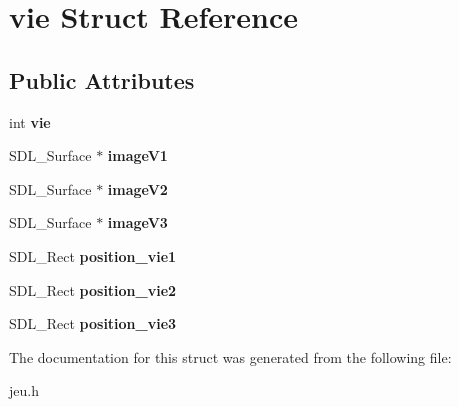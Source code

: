 \hypertarget{structvie}{}\section{vie Struct Reference}
\label{structvie}
\subsection*{Public Attributes}
\begin{DoxyCompactItemize}
\item 
\mbox{\label{structvie_a9148adc5f8f6ec8d8f727ac66a8962e9}} 
int {\bfseries vie}
\item 
\mbox{\label{structvie_a518752714976c2cdbb5a90aab06a01a0}} 
S\+D\+L\+\_\+\+Surface $\ast$ {\bfseries image\+V1}
\item 
\mbox{\label{structvie_a870f2303df486c07f77174c8e7e44dad}} 
S\+D\+L\+\_\+\+Surface $\ast$ {\bfseries image\+V2}
\item 
\mbox{\label{structvie_a1c22806e08f58952e01cae7a8121c3ee}} 
S\+D\+L\+\_\+\+Surface $\ast$ {\bfseries image\+V3}
\item 
\mbox{\label{structvie_aa7527826396fbe71ae41fea7e97663cb}} 
S\+D\+L\+\_\+\+Rect {\bfseries position\+\_\+vie1}
\item 
\mbox{\label{structvie_a32777dfb506a10fbed0463d7458d4e73}} 
S\+D\+L\+\_\+\+Rect {\bfseries position\+\_\+vie2}
\item 
\mbox{\label{structvie_a523509678183083f4d3c36e4223a719a}} 
S\+D\+L\+\_\+\+Rect {\bfseries position\+\_\+vie3}
\end{DoxyCompactItemize}


The documentation for this struct was generated from the following file\+:\begin{DoxyCompactItemize}
\item 
jeu.\+h\end{DoxyCompactItemize}
